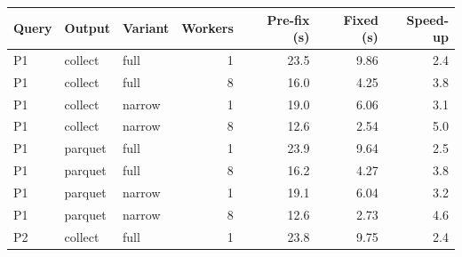 \begin{tabular}{lllrrrr}
\toprule
Query & Output & Variant & Workers & Pre-fix (s) & Fixed (s) & Speed-up \\
\midrule
P1 & collect & full & 1 & 23.5 & 9.86 & 2.4 \\
P1 & collect & full & 8 & 16.0 & 4.25 & 3.8 \\
P1 & collect & narrow & 1 & 19.0 & 6.06 & 3.1 \\
P1 & collect & narrow & 8 & 12.6 & 2.54 & 5.0 \\
P1 & parquet & full & 1 & 23.9 & 9.64 & 2.5 \\
P1 & parquet & full & 8 & 16.2 & 4.27 & 3.8 \\
P1 & parquet & narrow & 1 & 19.1 & 6.04 & 3.2 \\
P1 & parquet & narrow & 8 & 12.6 & 2.73 & 4.6 \\
P2 & collect & full & 1 & 23.8 & 9.75 & 2.4 \\
\bottomrule
\end{tabular}
